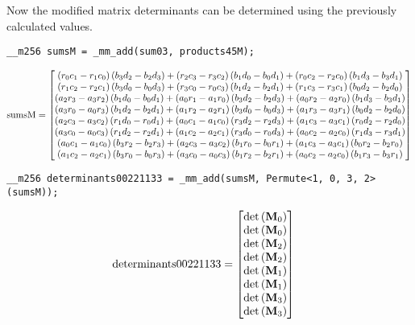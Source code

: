 Now the modified matrix determinants can be determined using the previously calculated values.

\begin{verbatim}
__m256 sumsM = _mm_add(sum03, products45M);
\end{verbatim} 
\begin{align*}
\mathrm{sumsM} 
=
\begin{bmatrix}
  \left(r_0c_1 - r_1c_0\right)\left(b_3d_2 - b_2d_3\right) 
+ \left(r_2c_3 - r_3c_2\right)\left(b_1d_0 - b_0d_1\right)
+ \left(r_0c_2 - r_2c_0\right)\left(b_1d_3 - b_3d_1\right)\\
  \left(r_1c_2 - r_2c_1\right)\left(b_3d_0 - b_0d_3\right)
+ \left(r_3c_0 - r_0c_3\right)\left(b_1d_2 - b_2d_1\right)
+ \left(r_1c_3 - r_3c_1\right)\left(b_0d_2 - b_2d_0\right)\\
  \left(a_2r_3 - a_3r_2\right)\left(b_1d_0 - b_0d_1\right)
+ \left(a_0r_1 - a_1r_0\right)\left(b_3d_2 - b_2d_3\right)
+ \left(a_0r_2 - a_2r_0\right)\left(b_1d_3 - b_3d_1\right)\\
  \left(a_3r_0 - a_0r_3\right)\left(b_1d_2 - b_2d_1\right)
+ \left(a_1r_2 - a_2r_1\right)\left(b_3d_0 - b_0d_3\right)
+ \left(a_1r_3 - a_3r_1\right)\left(b_0d_2 - b_2d_0\right)\\
  \left(a_2c_3 - a_3c_2\right)\left(r_1d_0 - r_0d_1\right)
+ \left(a_0c_1 - a_1c_0\right)\left(r_3d_2 - r_2d_3\right)
+ \left(a_1c_3 - a_3c_1\right)\left(r_0d_2 - r_2d_0\right)\\
  \left(a_3c_0 - a_0c_3\right)\left(r_1d_2 - r_2d_1\right)
+ \left(a_1c_2 - a_2c_1\right)\left(r_3d_0 - r_0d_3\right)
+ \left(a_0c_2 - a_2c_0\right)\left(r_1d_3 - r_3d_1\right)\\
  \left(a_0c_1 - a_1c_0\right)\left(b_3r_2 - b_2r_3\right)
+ \left(a_2c_3 - a_3c_2\right)\left(b_1r_0 - b_0r_1\right)
+ \left(a_1c_3 - a_3c_1\right)\left(b_0r_2 - b_2r_0\right)\\
  \left(a_1c_2 - a_2c_1\right)\left(b_3r_0 - b_0r_3\right)
+ \left(a_3c_0 - a_0c_3\right)\left(b_1r_2 - b_2r_1\right)
+ \left(a_0c_2 - a_2c_0\right)\left(b_1r_3 - b_3r_1\right)\\
\end{bmatrix}
\end{align*}

\begin{verbatim}
__m256 determinants00221133 = _mm_add(sumsM, Permute<1, 0, 3, 2>(sumsM));
\end{verbatim} 
\begin{align*}
\mathrm{determinants00221133} 
&=
\begin{bmatrix}
\mathrm{det}\left(\mathbf{M}_0\right)\\
\mathrm{det}\left(\mathbf{M}_0\right)\\
\mathrm{det}\left(\mathbf{M}_2\right)\\
\mathrm{det}\left(\mathbf{M}_2\right)\\
\mathrm{det}\left(\mathbf{M}_1\right)\\
\mathrm{det}\left(\mathbf{M}_1\right)\\
\mathrm{det}\left(\mathbf{M}_3\right)\\
\mathrm{det}\left(\mathbf{M}_3\right)\\
\end{bmatrix}
\end{align*}


